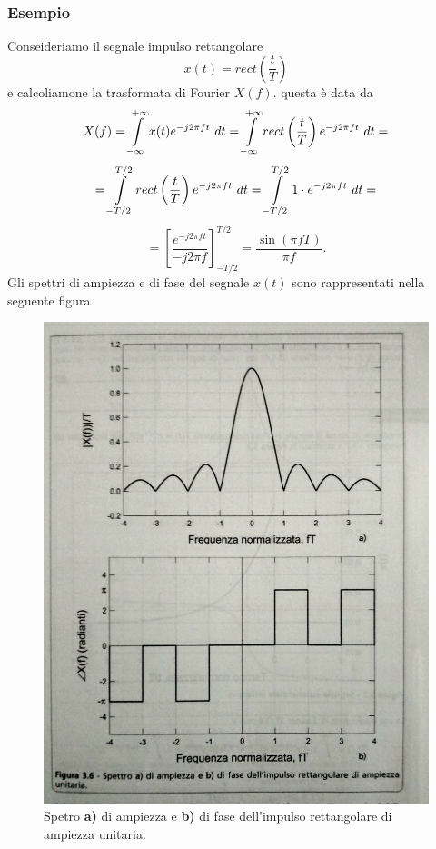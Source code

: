 \documentclass[12pt,oneside,openany]{memoir}
\numberwithin{equation}{subsection}
\newcommand{\dt}{\ dt}
\begin{document}
\subsubsection{Esempio}
Conseideriamo il segnale impulso rettangolare
\[
	x(t) = rect\left(\frac{t}{T}\right)
\]
e calcoliamone la trasformata di Fourier $X(f)$. questa \`e data da
\[
	X(f) = \int\displaylimits_{-\infty}^{+\infty} x(t) e^{-j 2 \pi f t} \dt
	= \int\displaylimits_{-\infty}^{+\infty} rect\left(\frac{t}{T}\right)
	e^{-j 2 \pi f t} \dt =
\]
\[
	= \int\displaylimits_{-T/2}^{T/2} rect\left(\frac{t}{T}\right)
	e^{-j 2 \pi f t} \dt = \int\displaylimits_{-T/2}^{T/2} 1 \cdot
	e^{-j 2 \pi f t} \dt =
\]
\[
	= \left[\frac{e^{-j 2 \pi f t}}{-j 2 \pi f}\right]_{-T/2}^{T/2} =
	\frac{\sin(\pi f T)}{\pi f}.
\]
Gli spettri di ampiezza e di fase del segnale $x(t)$ sono rappresentati nella
seguente figura
\begin{figure}[H]
	\centering
	\captionsetup{justification=centering}
	\includegraphics[width=1.0\textwidth]{images/spettro_rect_alpha.jpg}
	\caption{Spetro \textbf{a)} di ampiezza e \textbf{b)} di fase
		dell'impulso rettangolare di ampiezza unitaria.}
\end{figure}
\end{document}
